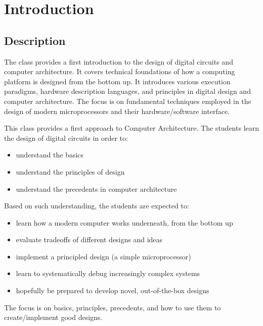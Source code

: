 \documentclass[a4paper]{report}
\begin{document}
\chapter{Introduction}
\section{Description}

The class provides a first introduction to the design of digital circuits and 
computer architecture. It covers technical foundations of how a computing platform 
is designed from the bottom up. It introduces various execution paradigms, hardware 
description languages, and principles in digital design and computer architecture. 
The focus is on fundamental techniques employed in the design of modern microprocessors 
and their hardware/software interface.
\bigskip

\begin{satz}[Overview]
    This class provides a first approach to Computer Architecture. The students learn the
    design of digital circuits in order to:
    \begin{itemize}
        \item understand the basics
        \item understand the principles of design
        \item understand the precedents in computer architecture
    \end{itemize}
\tcblower
    Based on such understanding, the students are expected to:
    \begin{itemize}
        \item learn how a modern computer works underneath, from the bottom up
        \item evaluate tradeoffs of different designs and ideas
        \item implement a principled design (a simple microprocessor) 
        \item learn to systematically debug increasingly complex systems
        \item hopefully be prepared to develop novel, out-of-the-box designs
    \end{itemize}
    
\end{satz}
\bigskip

The focus is on basics, principles, precedents, and how to use them to 
create/implement good designs.
\end{document}
